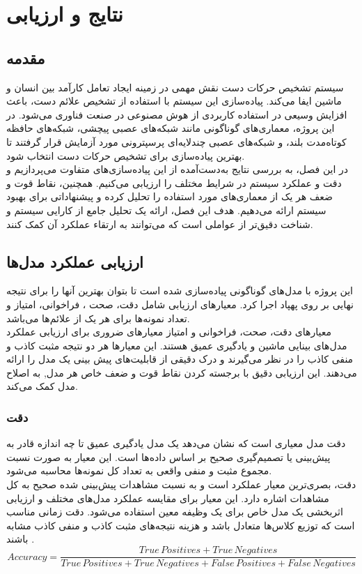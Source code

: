 \chapter{نتایج و ارزیابی}
\section{مقدمه}
سیستم تشخیص حرکات دست نقش مهمی در زمینه ایجاد تعامل کارآمد بین انسان و ماشین ایفا می‌کند. پیاده‌سازی این سیستم با استفاده از تشخیص علائم دست، باعث افزایش وسیعی در استفاده کاربردی از هوش مصنوعی  در صنعت فناوری می‌شود. در این پروژه، 
معماری‌های گوناگونی مانند شبکه‌های عصبی پیچشی، شبکه‌های حافظه کوتاه‌مدت بلند، و شبکه‌های عصبی چندلایه‌ای پرسپترونی مورد آزمایش قرار گرفتند تا بهترین پیاده‌سازی برای تشخیص حرکات دست انتخاب شود. 
\\
در این فصل، به بررسی نتایج به‌دست‌آمده از این پیاده‌سازی‌های متفاوت می‌پردازیم و دقت و عملکرد سیستم در شرایط مختلف را ارزیابی می‌کنیم. همچنین، نقاط قوت و ضعف هر یک از معماری‌های مورد استفاده 
را تحلیل کرده و پیشنهاداتی برای بهبود سیستم ارائه می‌دهیم. هدف این فصل، ارائه یک تحلیل جامع از کارایی سیستم و شناخت دقیق‌تر از عواملی است که می‌توانند به ارتقاء عملکرد آن کمک کنند.


\section{ارزیابی عملکرد مدل‌ها}

این پروژه با مدل‌های گوناگونی پیاده‌سازی شده است تا بتوان بهترین آنها را برای نتیجه نهایی بر روی پهپاد اجرا کرد. معیارهای ارزیابی شامل دقت، صحت ، فراخوانی، امتیاز  و
تعداد نمونه‌ها برای هر یک از علائم‌ها می‌باشد.
\\
معیار‌های دقت، صحت، فراخوانی و امتیاز  معیارهای ضروری برای ارزیابی عملکرد مدل‌های بینایی ماشین و یادگیری عمیق هستند. این معیار‌ها هر دو نتیجه مثبت کاذب و منفی کاذب را در نظر
می‌گیرند و درک دقیقی از قابلیت‌های پیش بینی یک مدل را ارائه می‌دهند. این ارزیابی دقیق با برجسته کردن نقاط قوت و ضعف خاص هر مدل, به اصلاح مدل کمک می‌کند.
\subsection{دقت}
دقت مدل معیاری است که نشان می‌دهد یک مدل یادگیری عمیق تا چه اندازه قادر به پیش‌بینی یا تصمیم‌گیری صحیح بر اساس داده‌ها است. این معیار به صورت نسبت مجموع مثبت و منفی واقعی به تعداد کل نمونه‌ها محاسبه می‌شود.
\\
دقت، بصری‌ترین معیار عملکرد است و به نسبت مشاهدات پیش‌بینی شده صحیح به کل مشاهدات اشاره دارد. این معیار برای مقایسه عملکرد مدل‌های مختلف و ارزیابی اثربخشی یک مدل خاص برای یک وظیفه معین استفاده می‌شود. دقت زمانی مناسب است که توزیع کلاس‌ها متعادل باشد و هزینه‌ نتیجه‌های مثبت کاذب و منفی کاذب مشابه باشند \cite{Accuracy53:online}.
\begin{equation}
    Accuracy = \frac{True \, Positives + True \, Negatives}{True \, Positives + True \, Negatives + False \, Positives + False \, Negatives}
\end{equation}


